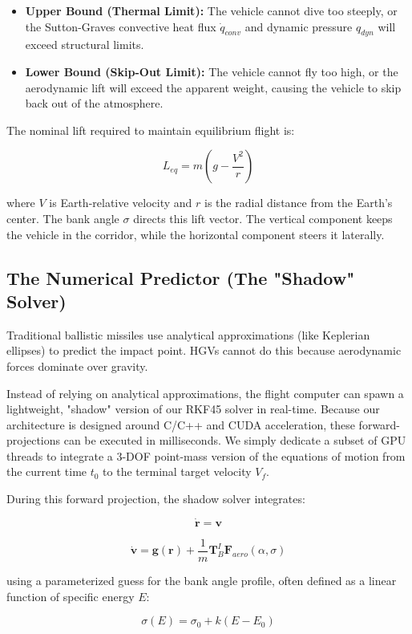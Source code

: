 \documentclass[11pt,a4paper]{article}
\theoremstyle{definition}
\numberwithin{equation}{section}
\begin{document}
\begin{itemize}
    \item \textbf{Upper Bound (Thermal Limit):} The vehicle cannot dive too steeply, or the Sutton-Graves convective heat flux $\dot{q}_{conv}$ and dynamic pressure $q_{dyn}$ will exceed structural limits.
    \item \textbf{Lower Bound (Skip-Out Limit):} The vehicle cannot fly too high, or the aerodynamic lift will exceed the apparent weight, causing the vehicle to skip back out of the atmosphere.
\end{itemize}

The nominal lift required to maintain equilibrium flight is:

$$L_{eq} = m \left( g - \frac{V^2}{r} \right)$$

where $V$ is Earth-relative velocity and $r$ is the radial distance from the Earth's center. The bank angle $\sigma$ directs this lift vector. The vertical component keeps the vehicle in the corridor, while the horizontal component steers it laterally.

\subsection{The Numerical Predictor (The "Shadow" Solver)}

Traditional ballistic missiles use analytical approximations (like Keplerian ellipses) to predict the impact point. HGVs cannot do this because aerodynamic forces dominate over gravity.

Instead of relying on analytical approximations, the flight computer can spawn a lightweight, "shadow" version of our RKF45 solver in real-time. Because our architecture is designed around C/C++ and CUDA acceleration, these forward-projections can be executed in milliseconds. We simply dedicate a subset of GPU threads to integrate a 3-DOF point-mass version of the equations of motion from the current time $t_0$ to the terminal target velocity $V_f$.

During this forward projection, the shadow solver integrates:

$$\mathbf{\dot{r}} = \mathbf{v}$$

$$\mathbf{\dot{v}} = \mathbf{g}(\mathbf{r}) + \frac{1}{m} \mathbf{T}_B^I \mathbf{F}_{aero}(\alpha, \sigma)$$

using a parameterized guess for the bank angle profile, often defined as a linear function of specific energy $E$:

$$\sigma(E) = \sigma_0 + k (E - E_0)$$
\end{document}
